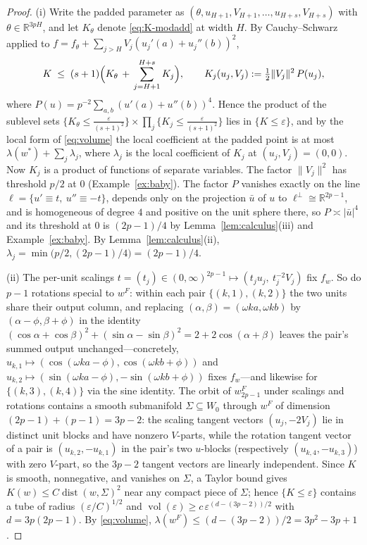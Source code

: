\documentclass[11pt]{amsart}
\theoremstyle{plain}
\theoremstyle{definition}
\newcommand{\R}{\mathbb{R}}
\DeclareMathOperator{\vol}{vol}
\begin{document}
\begin{proof}
(i) Write the padded parameter as $(\theta, u_{H+1}, V_{H+1}, \dots, u_{H+s}, V_{H+s})$ with $\theta \in \R^{3pH}$, and let $K_\theta$ denote \eqref{eq:K-modadd} at width $H$. By Cauchy--Schwarz applied to $f = f_\theta + \sum_{j > H} V_j (u_j' (a) + u_j''(b))^2$,
\[
   K \;\le\; (s+1)\Bigl( K_\theta \,+\, \sum_{j=H+1}^{H+s} K_j \Bigr),
   \qquad
   K_j(u_j, V_j) := \tfrac12 \|V_j\|^2\, P(u_j),
\]
where $P(u) = p^{-2}\sum_{a,b} (u'(a) + u''(b))^4$. Hence the product of the sublevel sets $\{K_\theta \le \tfrac{\varepsilon}{(s+1)^2}\} \times \prod_j \{K_j \le \tfrac{\varepsilon}{(s+1)^2}\}$ lies in $\{K \le \varepsilon\}$, and by the local form of \eqref{eq:volume} the local coefficient at the padded point is at most $\lambda(w^*) + \sum_j \lambda_j$, where $\lambda_j$ is the local coefficient of $K_j$ at $(u_j, V_j) = (0,0)$. Now $K_j$ is a product of functions of separate variables. The factor $\|V_j\|^2$ has threshold $p/2$ at $0$ (Example~\ref{ex:baby}). The factor $P$ vanishes exactly on the line $\ell = \{u' \equiv t,\ u'' \equiv -t\}$, depends only on the projection $\bar u$ of $u$ to $\ell^\perp \cong \R^{2p-1}$, and is homogeneous of degree $4$ and positive on the unit sphere there, so $P \asymp |\bar u|^4$ and its threshold at $0$ is $(2p-1)/4$ by Lemma~\ref{lem:calculus}(iii) and Example~\ref{ex:baby}. By Lemma~\ref{lem:calculus}(ii), $\lambda_j = \min\bigl(p/2, (2p-1)/4\bigr) = (2p-1)/4$.

(ii) The per-unit scalings $t = (t_j) \in (0,\infty)^{2p-1} \mapsto (t_j u_j,\ t_j^{-2} V_j)$ fix $f_w$. So do $p-1$ rotations special to $w^F$: within each pair $\{(k,1),(k,2)\}$ the two units share their output column, and replacing $(\alpha, \beta) = (\omega k a, \omega k b)$ by $(\alpha - \phi, \beta + \phi)$ in the identity $(\cos\alpha + \cos\beta)^2 + (\sin\alpha - \sin\beta)^2 = 2 + 2\cos(\alpha+\beta)$ leaves the pair's summed output unchanged---concretely, $u_{k,1} \mapsto (\cos(\omega k a - \phi), \cos(\omega k b + \phi))$ and $u_{k,2} \mapsto (\sin(\omega k a - \phi), -\sin(\omega k b + \phi))$ fixes $f_w$---and likewise for $\{(k,3),(k,4)\}$ via the sine identity. The orbit of $w^F_{2p-1}$ under scalings and rotations contains a smooth submanifold $\Sigma \subseteq W_0$ through $w^F$ of dimension $(2p-1) + (p-1) = 3p-2$: the scaling tangent vectors $(u_j, -2V_j)$ lie in distinct unit blocks and have nonzero $V$-parts, while the rotation tangent vector of a pair is $(u_{k,2}, -u_{k,1})$ in the pair's two $u$-blocks (respectively $(u_{k,4}, -u_{k,3})$) with zero $V$-part, so the $3p-2$ tangent vectors are linearly independent. Since $K$ is smooth, nonnegative, and vanishes on $\Sigma$, a Taylor bound gives $K(w) \le C \operatorname{dist}(w, \Sigma)^2$ near any compact piece of $\Sigma$; hence $\{K \le \varepsilon\}$ contains a tube of radius $(\varepsilon/C)^{1/2}$ and $\vol(\varepsilon) \ge c\, \varepsilon^{(d - (3p-2))/2}$ with $d = 3p(2p-1)$. By \eqref{eq:volume}, $\lambda(w^F) \le (d - (3p-2))/2 = 3p^2 - 3p + 1$.
\end{proof}
\end{document}
